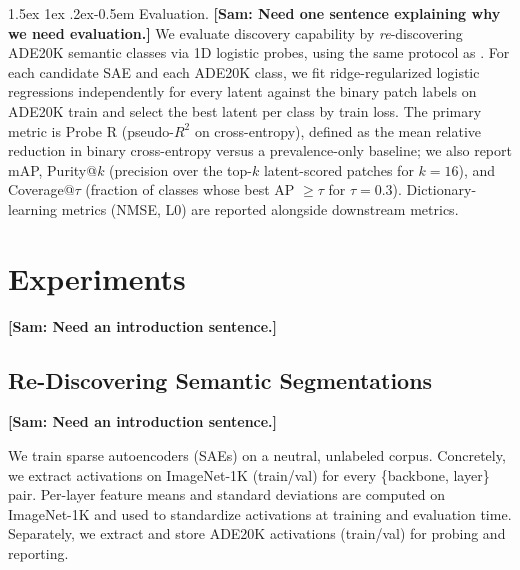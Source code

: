 \documentclass[10pt,twocolumn,letterpaper]{article}
\makeatletter
\newcommand{\sam}[1]{\textbf{\color{blue}[Sam: #1]}}
\renewcommand{\paragraph}{%
  \@startsection{paragraph}{4}%
  {\z@}{1.5ex \@plus 1ex \@minus .2ex}{-0.5em}%
  {\normalfont\normalsize\bfseries}%
}
\makeatother
\begin{document}
\paragraph{Evaluation.}
\sam{Need one sentence explaining why we need evaluation.}
We evaluate discovery capability by \textit{re}-discovering ADE20K \citep{zhou2017ade20k} semantic classes via 1D logistic probes, using the same protocol as \cite{gao2025scaling}.
For each candidate SAE and each ADE20K class, we fit ridge-regularized logistic regressions independently for every latent against the binary patch labels on ADE20K train and select the best latent per class by train loss. 
The primary metric is Probe R (pseudo-$R^2$ on cross-entropy), defined as the mean relative reduction in binary cross-entropy versus a prevalence-only baseline; we also report mAP, Purity@$k$ (precision over the top-$k$ latent-scored patches for $k=16$), and Coverage@$\tau$ (fraction of classes whose best AP $\geq \tau$ for $\tau=0.3$). 
Dictionary-learning metrics (NMSE, L0) are reported alongside downstream metrics.




\section{Experiments}

\sam{Need an introduction sentence.}

\subsection{Re-Discovering Semantic Segmentations}\label{sec:ade20k}

\sam{Need an introduction sentence.}

We train sparse autoencoders (SAEs) on a neutral, unlabeled corpus. 
Concretely, we extract activations on ImageNet-1K (train/val) for every \{backbone, layer\} pair. 
Per-layer feature means and standard deviations are computed on ImageNet-1K and used to standardize activations at training and evaluation time. 
Separately, we extract and store ADE20K activations (train/val) for probing and reporting.
\end{document}
